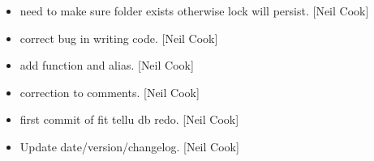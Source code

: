 \documentclass[a4paper,10pt,english]{report}
\begin{document}
\begin{itemize}
\item {} 
 \sphinxhyphen{} need to make sure folder exists otherwise lock will
persist. {[}Neil Cook{]}

\item {} 
 \sphinxhyphen{} correct bug in writing code. {[}Neil Cook{]}

\item {} 
 \sphinxhyphen{} add  function and alias. {[}Neil Cook{]}

\item {} 
 \sphinxhyphen{} correction to comments. {[}Neil Cook{]}

\item {} 
 \sphinxhyphen{} first commit of fit tellu db redo. {[}Neil Cook{]}

\item {} 
Update date/version/changelog. {[}Neil Cook{]}

\end{itemize}
\end{document}

